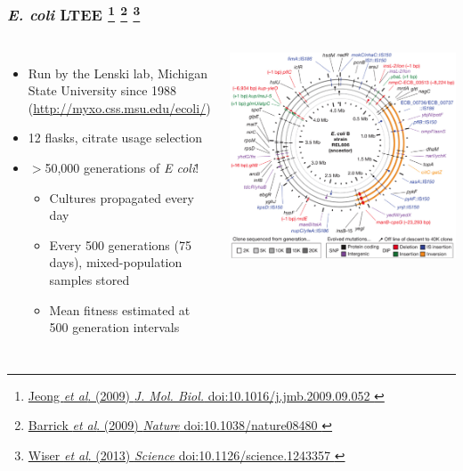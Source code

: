%
\begin{frame}
  \frametitle{\textit{E. coli} LTEE
                   \footnote{\tiny{\href{http://dx.doi.org/10.1016/j.jmb.2009.09.052
}{Jeong \textit{et al}. (2009) \textit{J. Mol. Biol.} doi:10.1016/j.jmb.2009.09.052
}}}
                   \footnote{\tiny{\href{http://dx.doi.org/10.1038/nature08480
}{Barrick \textit{et al}. (2009) \textit{Nature} doi:10.1038/nature08480
}}}
                   \footnote{\tiny{\href{http://dx.doi.org/10.1126/science.1243357
}{Wiser \textit{et al}. (2013) \textit{Science} doi:10.1126/science.1243357
}}}}
    \begin{columns}[c] 
        \begin{itemize}
          \item \textcolor{RawSienna}{Run by the Lenski lab, Michigan State University since 1988 \\
          (\href{http://myxo.css.msu.edu/ecoli/}{http://myxo.css.msu.edu/ecoli/})}
          \item \textcolor{hutton_green}{12 flasks, citrate usage selection}
          \item \textcolor{hutton_blue}{$>$50,000 generations of \textit{E coli}!}
          \begin{itemize}
            \item Cultures propagated every day
            \item Every 500 generations (75 days), mixed-population samples stored
            \item Mean fitness estimated at 500 generation intervals
          \end{itemize}
        \end{itemize}
        \includegraphics[width=\textwidth]{images/ltee_circular} \\

\end{columns}
\end{frame}
